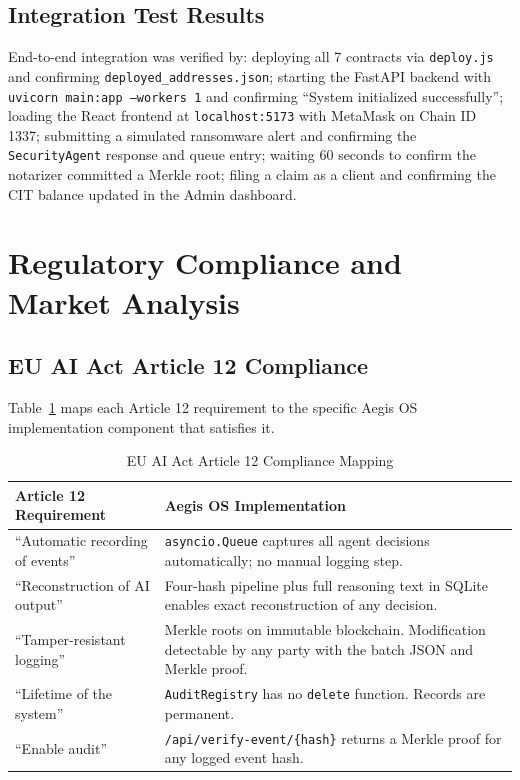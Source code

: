 \documentclass[12pt,a4paper]{article}
\begin{document}
\subsection{Integration Test Results}
End-to-end integration was verified by: deploying all 7 contracts via
\texttt{deploy.js} and confirming \texttt{deployed\_addresses.json};
starting the FastAPI backend with \texttt{uvicorn main:app --workers 1}
and confirming ``System initialized successfully''; loading the React
frontend at \texttt{localhost:5173} with MetaMask on Chain ID 1337;
submitting a simulated ransomware alert and confirming the
\texttt{SecurityAgent} response and queue entry; waiting 60 seconds to
confirm the notarizer committed a Merkle root; filing a claim as a
client and confirming the CIT balance updated in the Admin dashboard.

\section{Regulatory Compliance and Market Analysis}
\label{sec:compliance}

\subsection{EU AI Act Article 12 Compliance}

Table~\ref{tab:compliance} maps each Article 12 requirement to the
specific Aegis OS implementation component that satisfies it.

\begin{table}[ht]
\centering
\caption{EU AI Act Article 12 Compliance Mapping}
\label{tab:compliance}
\begin{tabular}{@{}p{5.5cm}p{8cm}@{}}
\toprule
\rowcolor{gray!15}
\textbf{Article 12 Requirement} & \textbf{Aegis OS Implementation} \\
\midrule
``Automatic recording of events'' &
\texttt{asyncio.Queue} captures all agent decisions automatically;
no manual logging step. \\
``Reconstruction of AI output'' &
Four-hash pipeline plus full reasoning text in SQLite enables
exact reconstruction of any decision. \\
``Tamper-resistant logging'' &
Merkle roots on immutable blockchain. Modification detectable
by any party with the batch JSON and Merkle proof. \\
``Lifetime of the system'' &
\texttt{AuditRegistry} has no \texttt{delete} function. Records are permanent. \\
``Enable audit'' &
\texttt{/api/verify-event/\{hash\}} returns a Merkle proof for
any logged event hash. \\
\bottomrule
\end{tabular}
\end{table}
\end{document}
